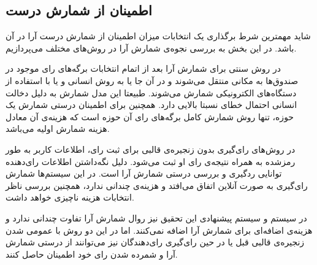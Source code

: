 \subsection{اطمینان از شمارش درست}
شاید مهمترین شرط برگذاری یک انتخابات میزان اطمینان از شمارش درست آرا در آن‌ باشد. در این بخش به بررسی نجوه‌ی شمارش آرا در روش‌های مختلف می‌پردازیم. 
\par
در روش سنتی برای شمارش آرا بعد از اتمام انتخابات برگه‌های رای‌ موجود در صندوق‌ها به مکانی منتقل می‌شوند و در آن‌ جا یا به روش انسانی و یا با استفاده از دستگاه‌های الکترونیکی شمارش می‌شوند. طبیعتا این مدل شمارش به دلیل دخالت انسانی احتمال خطای نسبتا بالایی دارد. همچنین برای اطمینان درستی شمارش یک حوزه، تنها روش شمارش کامل برگه‌های رای‌ آن حوزه است که هزینه‌ی آن معادل هزینه شمارش اولیه می‌باشد. 
\par 
در روش‌های رای‌گیری بدون زنجیره‌ی قالبی برای ثبت رای، اطلاعات کاربر به طور رمزشده به همراه نتیجه‌ی رای‌ او ثبت می‌شود. دلیل نگه‌داشتن اطلاعات رای‌دهنده توانایی رد‌گیری و بررسی درستی شمارش آرا است. در این سیستم‌ها شمارش رای‌گیری به صورت آنلاین اتفاق می‌افتد و هزینه‌ی چندانی ندارد، همچنین بررسی ناظر انتخابات هزینه‌ ناچیزی خواهد داشت. 
\par 
در سیستم  و سیستم پیشنهادی این تحقیق نیز روال شمارش آرا تفاوت چندانی ندارد و هزینه‌ی اضافه‌ای برای شمارش آرا اضافه نمی‌کنند. اما در این دو روش با عمومی شدن زنجیره‌ی قالبی قبل یا در حین رای‌گیری رای‌دهندگان نیز می‌توانند از درستی شمارش آرا و شمرده شدن رای خود اطمینان حاصل کنند. 

